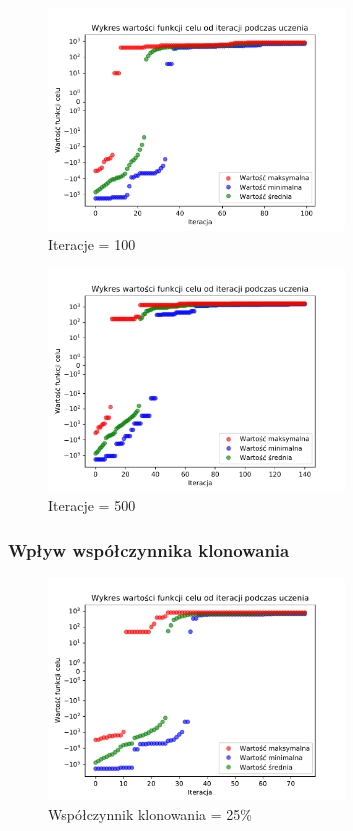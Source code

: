 \documentclass[a4paper]{article}
\begin{document}
\begin{figure}[H]
    \centering
    \includegraphics[width=0.7\textwidth]{plots/iteration_100.pdf}
    \caption{Iteracje = 100}
    \label{fig:iteration_100}
\end{figure}

\begin{figure}[H]
    \centering
    \includegraphics[width=0.7\textwidth]{plots/iteration_500.pdf}
    \caption{Iteracje = 500}
    \label{fig:iteration_500}
\end{figure}


\subsubsection{Wpływ współczynnika klonowania}

\begin{figure}[H]
    \centering
    \includegraphics[width=0.7\textwidth]{plots/clone_025.pdf}
    \caption{Współczynnik klonowania = 25\%}
    \label{fig:clone_025}
\end{figure}
\end{document}

